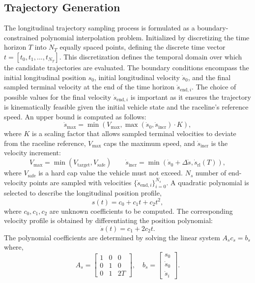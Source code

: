 \subsection{Trajectory Generation}
The longitudinal trajectory sampling process is formulated as a boundary-constrained polynomial interpolation problem.
Initialized by discretizing the time horizon $T$ into $N_T$ equally spaced points, defining the discrete time vector $t = \left[t_0, t_1, ..., t_{N_T}\right]$.
This discretization defines the temporal domain over which the candidate trajectories are evaluated.
The boundary conditions encompass the initial longitudinal position $s_{0}$, initial longitudinal velocity $\dot{s}_0$, and the final sampled terminal velocity at the end of the time horizon $\dot{s}_{\text{end}, i}$.
The choice of possible values for the final velocity $\dot{s}_{\text{end}, i}$ is important as it ensures the trajectory is kinematically feasible given the initial vehicle state and the raceline's reference speed.
An upper bound is computed as follows:
\begin{equation}
    \dot{s}_{\text{max}} = \min(V_{\text{max}}, \max(\dot{s}_0, \dot{s}_{\text{incr}}) \cdot K ),
\end{equation}
where $K$ is a scaling factor that allows sampled terminal velocities to deviate from the raceline reference, $V_{\text{max}}$ caps the maximum speed, and $\dot{s}_{\text{incr}}$ is the velocity increment:
\begin{equation}
    V_{\text{max}} = \min(V_{\text{target}}, V_{\text{safe}}) \qquad \dot{s}_{\text{incr}} = \min(\dot{s}_0 + \Delta \dot{s}, \dot{s}_{\text{rl}}(T)),
\end{equation}
where $V_{\text{safe}}$ is a hard cap value the vehicle must not exceed.
$N_s$ number of end-velocity points are sampled with velocities $\{ \dot{s}_{\text{end}, i} \}_{i=0}^{N_s}$. 
A quadratic polynomial is selected to describe the longitudinal position profile,
\begin{equation}
    s(t) = c_0 + c_1 t + c_2 t^2 ,
\end{equation}
where $c_0, c_1, c_2$ are unknown coefficients to be computed. The corresponding velocity profile is obtained by differentiating the position polynomial:
\begin{equation}
    \dot{s}(t) = c_1 + 2c_2 t.
\end{equation}
The polynomial coefficients are determined by solving the linear system $A_s c_s = b_s$ where,
\begin{equation}
    A_s = \begin{bmatrix}
        1 & 0 & 0 \\
        0 & 1 & 0 \\
        0 & 1 & 2T
    \end{bmatrix}, \quad
    b_s = \begin{bmatrix}
        s_0 \\
        \dot{s}_0\\
        \dot{s}_i
    \end{bmatrix}.
\end{equation}
